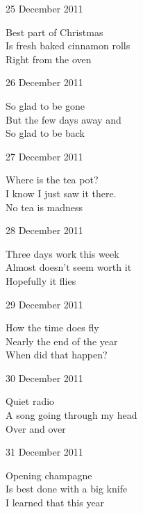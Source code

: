 \documentclass[12pt]{article}
\begin{document}
25 December 2011

Best part of Christmas \\
Is fresh baked cinnamon rolls \\
Right from the oven

26 December 2011

So glad to be gone \\
But the few days away and \\
So glad to be back

27 December 2011

Where is the tea pot? \\
I know I just saw it there. \\
No tea is madness

28 December 2011

Three days work this week \\
Almost doesn't seem worth it \\
Hopefully it flies

29 December 2011

How the time does fly \\
Nearly the end of the year \\
When did that happen?

30 December 2011

Quiet radio \\
A song going through my head \\
Over and over

31 December 2011

Opening champagne \\
Is best done with a big knife \\
I learned that this year
\end{document}
